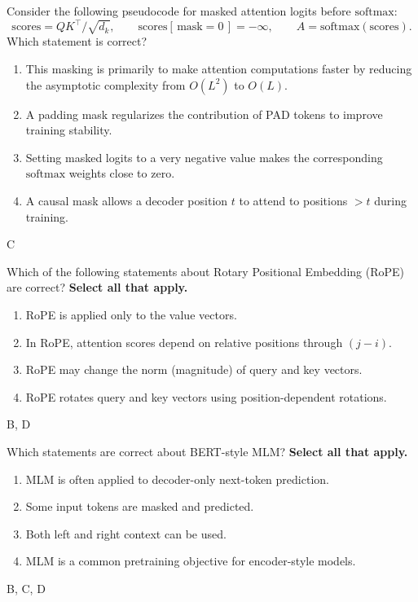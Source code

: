
\question[4]
Consider the following pseudocode for masked attention logits before \(\text{softmax}\):
\[
\text{scores} = QK^\top/\sqrt{d_k},\qquad
\text{scores}[\,\text{mask}=0\,] = -\infty,\qquad
A=\text{softmax}(\text{scores}).
\]
Which statement is correct?
\begin{enumerate}
\item This masking is primarily to make attention computations faster by reducing the asymptotic complexity from \(O(L^2)\) to \(O(L)\).
\item A padding mask regularizes the contribution of PAD tokens to improve training stability.
\item Setting masked logits to a very negative value makes the corresponding \(\text{softmax}\) weights close to zero.
\item A causal mask allows a decoder position \(t\) to attend to positions \(>t\) during training.
\end{enumerate}
\begin{soln}
C
\end{soln}

\question[4]
Which of the following statements about Rotary Positional Embedding (RoPE) are correct? \textbf{Select all that apply.}

\begin{enumerate}
\item RoPE is applied only to the value vectors. 
\item In RoPE, attention scores depend on relative positions through $(j-i)$.
\item RoPE may change the norm (magnitude) of query and key vectors.
\item RoPE rotates query and key vectors using position-dependent rotations. 
\end{enumerate}

\begin{soln}
B, D
\end{soln}


\question[4]
Which statements are correct about BERT-style MLM? \textbf{Select all that apply.}
\begin{enumerate}
\item MLM is often applied to decoder-only next-token prediction.
\item Some input tokens are masked and predicted.
\item Both left and right context can be used.
\item MLM is a common pretraining objective for encoder-style models.
\end{enumerate}
\begin{soln}
B, C, D
\end{soln}

